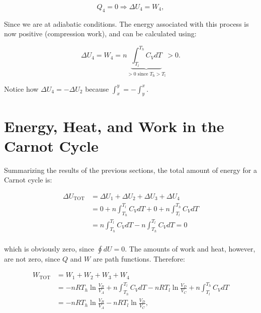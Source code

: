 \documentclass[
  9pt,
]{extbook}
\theoremstyle{definition}
\theoremstyle{definition}
\theoremstyle{definition}
\theoremstyle{definition}
\theoremstyle{remark}
\begin{document}
\begin{equation}
Q_4 = 0 \Rightarrow \Delta U_4 = W_4,
  \label{eq:CCst4}
\end{equation}

Since we are at adiabatic conditions. The energy associated with this process is now positive (compression work), and can be calculated using:

\begin{equation}
\Delta U_4 = W_4 = n \underbrace{\int_{T_l}^{T_h} C_V dT}_{>0 \text{ since } T_\mathrm{h}>T_\mathrm{l}} > 0.
  \label{eq:CCst4b}
\end{equation}

Notice how \(\Delta U_4 = - \Delta U_2\) because \(\int_x^y=-\int_y^x\).

\section{Energy, Heat, and Work in the Carnot Cycle}\label{UWQCarnot}

Summarizing the results of the previous sections, the total amount of energy for a Carnot cycle is:

\begin{equation}
\begin{aligned}
  \Delta U_{\text{TOT}} & = \Delta U_1+\Delta U_2+\Delta U_3+\Delta U_4 \\
                 & = 0 + n \int_{T_h}^{T_l} C_V dT + 0 + n \int_{T_l}^{T_h} C_V dT  \\
                 & = n \int_{T_h}^{T_l} C_V dT - n \int_{T_h}^{T_l} C_V dT = 0 \\
\end{aligned}
  \label{eq:UtotCC}
\end{equation}

which is obviously zero, since \(\oint dU=0\). The amounts of work and heat, however, are not zero, since \(Q\) and \(W\) are path functions. Therefore:

\begin{equation}
\begin{aligned}
  W_{\text{TOT}} & = W_1+W_2+W_3+W_4 \\
                 & = - nRT_h \ln \frac{V_B}{V_A} + n \int_{T_h}^{T_l} C_V dT - nRT_l \ln \frac{V_D}{V_C} + n \int_{T_l}^{T_h} C_V dT \\
                 & = - nRT_h \ln \frac{V_B}{V_A} - nRT_l \ln \frac{V_D}{V_C}, \\
\end{aligned}
  \label{eq:WtotCC}
\end{equation}
\end{document}

